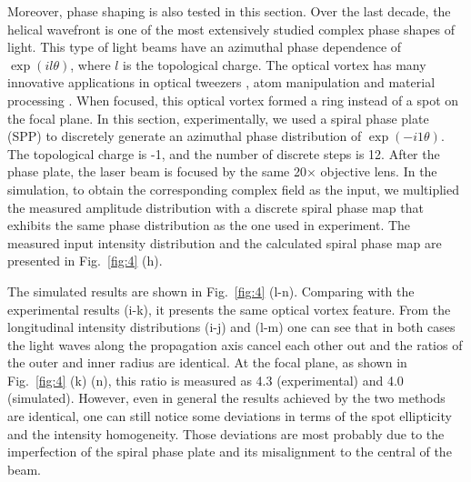 \documentclass[9pt,twocolumn,twoside]{osajnl}
\begin{document}
Moreover, phase shaping is also tested in this section. Over the last decade, the helical wavefront is one of the most extensively studied complex phase shapes of light. This type of light beams have an azimuthal phase dependence of $\exp(il\theta)$, where $l$ is the topological charge. The optical vortex has many innovative applications in optical tweezers \cite{padgett2011tweezers}, atom manipulation \cite{ladavac2004microoptomechanical} and material processing \cite{hnatovsky2010materials}. When focused, this optical vortex formed a ring instead of a spot on the focal plane. In this section, experimentally, we used a spiral phase plate (SPP) to discretely generate an azimuthal phase distribution of $\exp(-i1\theta)$. The topological charge is -1, and the number of discrete steps is 12. After the phase plate, the laser beam is focused by the same 20$\times$ objective lens. In the simulation, to obtain the corresponding complex field as the input, we multiplied the measured amplitude distribution with a discrete spiral phase map that exhibits the same phase distribution as the one used in experiment. The measured input intensity distribution and the calculated spiral phase map are presented in Fig.~\ref{fig:4} (h).

The simulated results are shown in Fig.~\ref{fig:4} (l-n). Comparing with the experimental results (i-k), it presents the same optical vortex feature. From the longitudinal intensity distributions (i-j) and (l-m) one can see that in both cases the light waves along the propagation axis cancel each other out and the ratios of the outer and inner radius are identical. At the focal plane, as shown in Fig.~\ref{fig:4} (k) (n), this ratio is measured as 4.3 (experimental) and 4.0 (simulated). However, even in general the results achieved by the two methods are identical, one can still notice some deviations in terms of the spot ellipticity and the intensity homogeneity. Those deviations are most probably due to the imperfection of the spiral phase plate and its misalignment to the central of the beam.          
\end{document}
